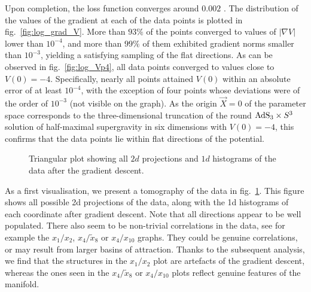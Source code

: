 \documentclass[11pt,a4paper]{article}
\newcommand{\gl}[1]{\marginpar{\parbox{\marginparwidth}{\boldmath $\Longleftarrow$}}{\boldmath\bfseries (gl: #1)}}
\begin{document}
	Upon completion, the loss function converges around $0.002$ \gl{$10^{-3}$?}. The distribution of the values of the gradient at each of the data points is plotted in fig.~\ref{fig:log_grad_V}. More than $93\%$ of the points converged to values of $\vert\nabla V\vert$ lower than $10^{-4}$, and more than $99\%$ of them exhibited gradient norms smaller than $10^{-3}$, yielding a satisfying sampling of the flat directions. As can be observed in fig.~\ref{fig:log_Vp4}, all data points converged to values close to $V(0)=-4$. Specifically, nearly all points attained $V(0)$ within an absolute error of at least $10^{-4}$, with the exception of four points whose deviations were of the order of $10^{-3}$ (not visible on the graph). As the origin $\vec{X}=0$ of the parameter space corresponds to the three-dimensional truncation of the round ${\rm AdS}_{3}\times S^{3}$ solution of half-maximal supergravity in six dimensions with $V(0)=-4$, this confirms that the data points lie within flat directions of the potential.

	\begin{figure}
		\centering
		\caption{Triangular plot showing all $2d$ projections and $1d$ histograms of the data after the gradient descent.}
		\label{triangular_plot_1_2_4_8_10}
	\end{figure}
	
	As a first visualisation, we present a tomography of the data in fig.~\ref{triangular_plot_1_2_4_8_10}. This figure shows all possible 2d projections of the data, along with the 1d histograms of each coordinate after gradient descent. Note that all directions appear to be well populated. There also seem to be non-trivial correlations in the data, see for example the $x_1/x_2$, $x_4/\tilde{x}_8$ or $x_4/x_{10}$ graphs. They could be genuine correlations, or may result from larger basins of attraction. Thanks to the subsequent analysis, we find that the structures in the $x_1/x_2$ plot are artefacts of the gradient descent, whereas the ones seen in the $x_4/\tilde{x}_8$ or $x_4/x_{10}$ plots reflect genuine features of the manifold. 
\end{document}
